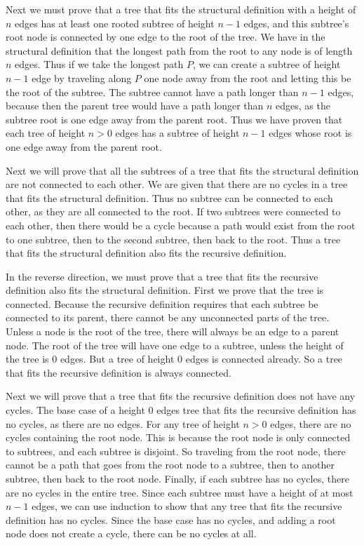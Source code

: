 \documentclass[12pt]{article}
\begin{document}
Next we must prove that a tree that fits the structural definition with a height of \(n\) edges has at least one rooted subtree of height \(n-1\) edges, and this
subtree's root node is connected by one edge to the root of the tree. We have in the structural definition that the longest path from the root to any node is of length
\(n\) edges. Thus if we take the longest path \(P\), we can create a subtree of height \(n-1\) edge by traveling along \(P\) one node away from the root and letting this
be the root of the subtree. The subtree cannot have a path longer than \(n-1\) edges, because then the parent tree would have a path longer than \(n\) edges, as the subtree
root is one edge away from the parent root. Thus we have proven that each tree of height \(n>0\) edges has a subtree of height \(n-1\) edges whose root is one edge away from
the parent root.

Next we will prove that all the subtrees of a tree that fits the structural definition are not connected to each other. We are given that there are no cycles in a tree
that fits the structural definition. Thus no subtree can be connected to each other, as they are all connected to the root. If two subtrees were connected to each other,
then there would be a cycle because a path would exist from the root to one subtree, then to the second subtree, then back to the root. Thus a tree that fits the structural
definition also fits the recursive definition.

In the reverse direction, we must prove that a tree that fits the recursive definition also fits the structural definition. First we prove that the tree is connected.
Because the recursive definition requires that each subtree be connected to its parent, there cannot be any unconnected parts of the tree. Unless a node is the root of the
tree, there will always be an edge to a parent node. The root of the tree will have one edge to a subtree, unless the height of the tree is \(0\) edges. But a tree of height
\(0\) edges is connected already. So a tree that fits the recursive definition is always connected.

Next we will prove that a tree that fits the recursive definition does not have any cycles. The base case of a height \(0\) edges tree that fits the recursive definition has
no cycles, as there are no edges. For any tree of height \(n>0\) edges, there are no cycles containing the root node. This is because the root node is only connected to subtrees,
and each subtree is disjoint. So traveling from the root node, there cannot be a path that goes from the root node to a subtree, then to another subtree, then back to the root
node. Finally, if each subtree has no cycles, there are no cycles in the entire tree. Since each subtree must have a height of at most \(n-1\) edges, we can use induction to show
that any tree that fits the recursive definition has no cycles. Since the base case has no cycles, and adding a root node does not create a cycle, there can be no cycles at all.
\end{document}
